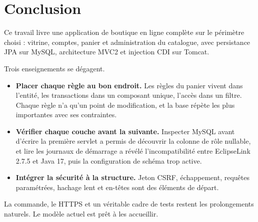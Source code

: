 \chapter{Conclusion}

Ce travail livre une application de boutique en ligne complète sur le périmètre choisi : vitrine, comptes, panier et administration du catalogue, avec persistance JPA sur MySQL, architecture MVC2 et injection CDI sur Tomcat.

Trois enseignements se dégagent.
\begin{itemize}
  \item \textbf{Placer chaque règle au bon endroit.} Les règles du panier vivent dans l'entité, les transactions dans un composant unique, l'accès dans un filtre. Chaque règle n'a qu'un point de modification, et la base répète les plus importantes avec ses contraintes.
  \item \textbf{Vérifier chaque couche avant la suivante.} Inspecter MySQL avant d'écrire la première servlet a permis de découvrir la colonne de rôle nullable, et lire les journaux de démarrage a révélé l'incompatibilité entre EclipseLink 2.7.5 et Java 17, puis la configuration de schéma trop active.
  \item \textbf{Intégrer la sécurité à la structure.} Jeton CSRF, échappement, requêtes paramétrées, hachage lent et en-têtes sont des éléments de départ.
\end{itemize}

La commande, le HTTPS et un véritable cadre de tests restent les prolongements naturels. Le modèle actuel est prêt à les accueillir.
